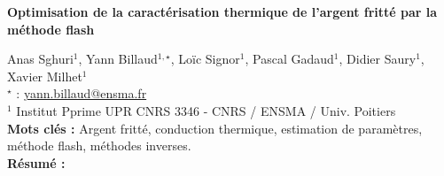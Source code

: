 


    \newpage


%
\begin{flushleft}
\addtocounter{section}{1}
{\Large \textbf{Optimisation de la caractérisation thermique de l'argent fritté par la méthode flash}}\label{ref:44}
\end{flushleft}
%
Anas Sghuri$^{1}$, Yann Billaud$^{1,\star}$, Loïc Signor$^{1}$, Pascal Gadaud$^{1}$, Didier Saury$^{1}$, Xavier Milhet$^{1}$\\[2mm]
$^{\star}$ \Letter : \url{yann.billaud@ensma.fr}\\[2mm]
{\footnotesize $^{1}$ Institut Pprime UPR CNRS 3346 - CNRS / ENSMA / Univ. Poitiers}\\
[4mm]
%
\noindent \textbf{Mots clés : } Argent fritté, conduction thermique, estimation de paramètres, méthode flash, méthodes inverses.\\[4mm]
%
\noindent \textbf{Résumé : } 

